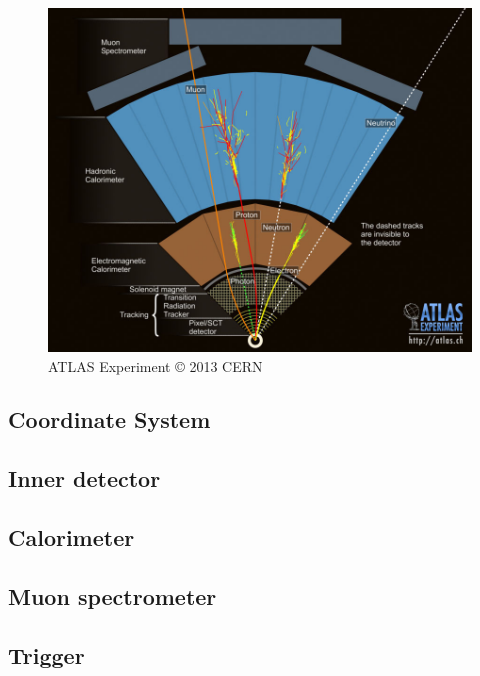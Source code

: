 
\begin{figure}
	\includegraphics[width=\largefigwidth]{tex/experiment/atlas_wedge}
	\caption{ATLAS Experiment \copyright\xspace 2013 CERN}
	\label{fig:atlas_wedge}
\end{figure}

\subsection{Coordinate System}
\subsection{Inner detector}
\subsection{Calorimeter}
\subsection{Muon spectrometer}
\subsection{Trigger}
